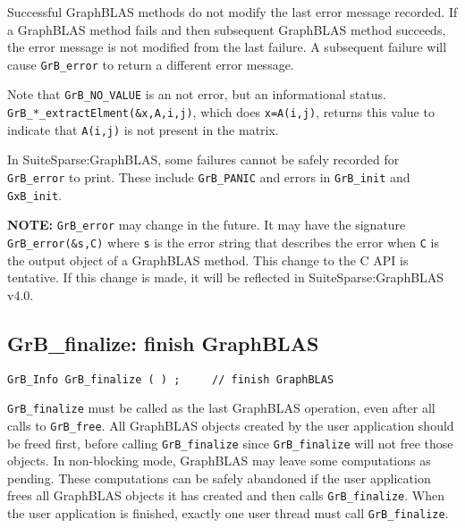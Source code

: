 \documentclass[12pt]{article}
\begin{document}
Successful GraphBLAS methods do not modify the last error message recorded.  If
a GraphBLAS method fails and then subsequent GraphBLAS method succeeds, the
error message is not modified from the last failure.  A subsequent failure
will cause \verb'GrB_error' to return a different error message.

Note that \verb'GrB_NO_VALUE' is an not error, but an informational status.
\verb'GrB_*_extractElment(&x,A,i,j)', which does \verb'x=A(i,j)', returns this
value to indicate that \verb'A(i,j)' is not present in the matrix.

In SuiteSparse:GraphBLAS, some failures cannot be safely recorded for
\verb'GrB_error' to print.  These include \verb'GrB_PANIC' and errors in
\verb'GrB_init' and \verb'GxB_init'.

{\bf NOTE:} \verb'GrB_error' may change in the future.  It may have the signature
\verb'GrB_error(&s,C)' where \verb's' is the error string that describes the
error when \verb'C' is the output object of a GraphBLAS method.  This change to
the C API is tentative.  If this change is made, it will be reflected in
SuiteSparse:GraphBLAS v4.0.

\newpage
\subsection{{\sf GrB\_finalize:} finish GraphBLAS} %
\label{finalize}

\begin{mdframed}[userdefinedwidth=6in]
{\footnotesize
\begin{verbatim}
GrB_Info GrB_finalize ( ) ;     // finish GraphBLAS
\end{verbatim}
}\end{mdframed}

\verb'GrB_finalize' must be called as the last GraphBLAS operation, even after
all calls to \verb'GrB_free'.  All GraphBLAS objects created by the user
application should be freed first, before calling \verb'GrB_finalize' since
\verb'GrB_finalize' will not free those objects.  In non-blocking mode,
GraphBLAS may leave some computations as pending.  These computations can be
safely abandoned if the user application frees all GraphBLAS objects it has
created and then calls \verb'GrB_finalize'.  When the user application is
finished, exactly one user thread must call \verb'GrB_finalize'.
\end{document}
